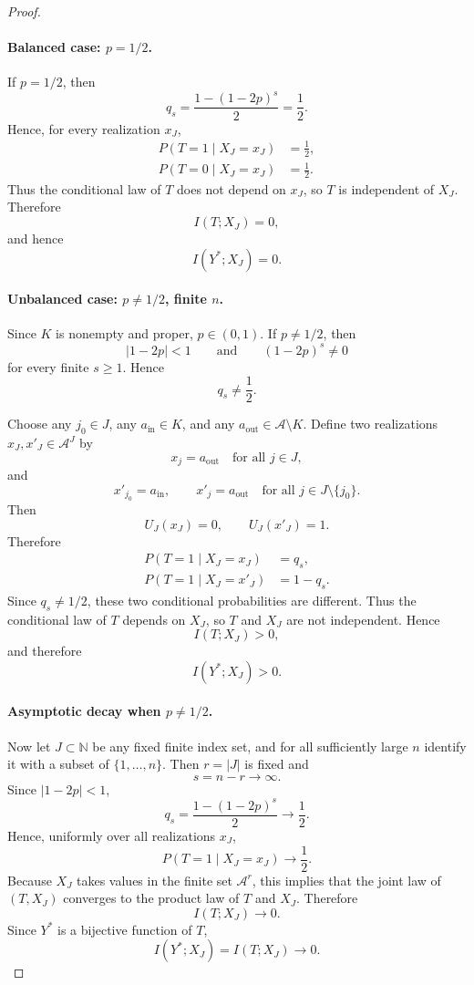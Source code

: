 \documentclass{article} %
\theoremstyle{plain}
\theoremstyle{definition}
\theoremstyle{remark}
\begin{document}
\begin{proof}
\paragraph{Balanced case: \(p=1/2\).}
If \(p=1/2\), then
\[
q_s = \frac{1-(1-2p)^s}{2} = \frac{1}{2}.
\]
Hence, for every realization \(x_J\),
\[
\begin{aligned}
P(T=1\mid X_J=x_J)&=\tfrac12,\\
P(T=0\mid X_J=x_J)&=\tfrac12.
\end{aligned}
\]
Thus the conditional law of \(T\) does not depend on \(x_J\), so \(T\) is independent
of \(X_J\). Therefore
\[
I(T;X_J)=0,
\]
and hence
\[
I(Y^*;X_J)=0.
\]

\paragraph{Unbalanced case: \(p\neq 1/2\), finite \(n\).}
Since \(K\) is nonempty and proper, \(p\in(0,1)\). If \(p\neq 1/2\), then
\[
|1-2p|<1
\qquad\text{and}\qquad
(1-2p)^s \neq 0
\]
for every finite \(s\ge 1\). Hence
\[
q_s \neq \frac12.
\]

Choose any \(j_0\in J\), any \(a_{\mathrm{in}}\in K\), and any
\(a_{\mathrm{out}}\in \mathcal A\setminus K\). Define two realizations
\(x_J,x'_J\in \mathcal A^J\) by
\[
x_j = a_{\mathrm{out}} \quad \text{for all } j\in J,
\]
and
\[
x'_{j_0}=a_{\mathrm{in}},
\qquad
x'_j=a_{\mathrm{out}} \quad \text{for all } j\in J\setminus\{j_0\}.
\]
Then
\[
U_J(x_J)=0,
\qquad
U_J(x'_J)=1.
\]
Therefore
\[
\begin{aligned}
P(T=1\mid X_J=x_J)&=q_s,\\
P(T=1\mid X_J=x'_J)&=1-q_s.
\end{aligned}
\]
Since \(q_s\neq 1/2\), these two conditional probabilities are different. Thus the
conditional law of \(T\) depends on \(X_J\), so \(T\) and \(X_J\) are not independent.
Hence
\[
I(T;X_J)>0,
\]
and therefore
\[
I(Y^*;X_J)>0.
\]

\paragraph{Asymptotic decay when \(p\neq 1/2\).}
Now let \(J\subset\mathbb N\) be any fixed finite index set, and for all sufficiently large
\(n\) identify it with a subset of \(\{1,\ldots,n\}\). Then \(r=|J|\) is fixed and
\[
s=n-r \to \infty.
\]
Since \(|1-2p|<1\),
\[
q_s = \frac{1-(1-2p)^s}{2} \to \frac12.
\]
Hence, uniformly over all realizations \(x_J\),
\[
P(T=1\mid X_J=x_J)\to \frac12.
\]
Because \(X_J\) takes values in the finite set \(\mathcal A^r\), this implies that the joint
law of \((T,X_J)\) converges to the product law of \(T\) and \(X_J\). Therefore
\[
I(T;X_J)\to 0.
\]
Since \(Y^*\) is a bijective function of \(T\),
\[
I(Y^*;X_J)=I(T;X_J)\to 0.
\]


\end{proof}
\end{document}
